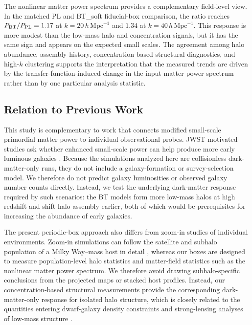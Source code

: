 \documentclass[
 reprint,
 superscriptaddress,
 nofootinbib,
 nobibnotes,
 amsmath,
 amssymb,
 aps,
 prd,
 floatfix,
 longbibliography
]{revtex4-2}
\begin{document}
The nonlinear matter power spectrum provides a complementary field-level view. In the matched PL and BT\_soft fiducial-box comparison, the ratio reaches $P_{\rm BT}/P_{\rm PL}=1.17$ at $k=20\,h\,\mathrm{Mpc}^{-1}$ and $1.34$ at $k=40\,h\,\mathrm{Mpc}^{-1}$. This response is more modest than the low-mass halo and concentration signals, but it has the same sign and appears on the expected small scales. The agreement among halo abundance, assembly history, concentration-based structural diagnostics, and high-$k$ clustering supports the interpretation that the measured trends are driven by the transfer-function-induced change in the input matter power spectrum rather than by one particular analysis statistic.

\subsection{Relation to Previous Work}

This study is complementary to work that connects modified small-scale primordial matter power to individual observational probes. JWST-motivated studies ask whether enhanced small-scale power can help produce more early luminous galaxies \citep{Parashari23JWSTPPS,Hira24bluetilt}. Because the simulations analyzed here are collisionless dark-matter-only runs, they do not include a galaxy-formation or survey-selection model. We therefore do not predict galaxy luminosities or observed galaxy number counts directly. Instead, we test the underlying dark-matter response required by such scenarios: the BT models form more low-mass halos at high redshift and shift halo assembly earlier, both of which would be prerequisites for increasing the abundance of early galaxies.

The present periodic-box approach also differs from zoom-in studies of individual environments. Zoom-in simulations can follow the satellite and subhalo population of a Milky Way--mass host in detail \citep{Wu25BT}, whereas our boxes are designed to measure population-level halo statistics and matter-field statistics such as the nonlinear matter power spectrum. We therefore avoid drawing subhalo-specific conclusions from the projected maps or stacked host profiles. Instead, our concentration-based structural measurements provide the corresponding dark-matter-only response for isolated halo structure, which is closely related to the quantities entering dwarf-galaxy density constraints and strong-lensing analyses of low-mass structure \citep{Dekker25DwarfPPS,Gilman22SubgalacticPPS}.
\end{document}
